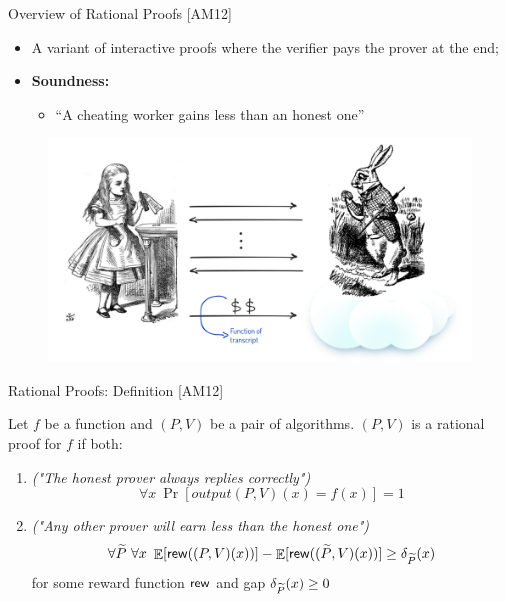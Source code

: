 \begin{frame}{Overview of Rational Proofs [AM12]}
\begin{itemize}[<+- | alert@+>]
	\item A variant of interactive proofs where the verifier pays the prover at the end;
	\item \textbf{Soundness:}
	\begin{itemize}
		\item ``A cheating worker gains less than an honest one''
	\end{itemize}
\end{itemize}
\begin{figure}
	\includegraphics[scale=0.23]{pics/interaction.png}
\end{figure}
\end{frame}


\begin{frame}{Rational Proofs: Definition [AM12]}
		\begin{framed}
			Let $f$ be a function and $(P,V)$ be a pair of algorithms. $(P,V)$ is a rational proof for $f$ if both:
			\onslide<+->
			\begin{enumerate}[<+- | alert@+>]
				\item \emph{("The honest prover always replies correctly")} 
				$$ \forall x\  \Pr[output(P,V)(x) = f(x) ] = 1$$
				\item \emph{("Any other prover will earn less than the honest one")}
				$$ \forall \widetilde{P} \ \forall x \  \mathop{\mathbb{E}}[\mathsf{rew}((P,V)(x))] - \mathop{\mathbb{E}}[\mathsf{rew}((\widetilde{P},V)(x))] \geq \delta_{\widetilde{P}}(x)  $$
				for some reward function $\mathsf{rew}$ and gap $\delta_{\widetilde{P}}(x) \geq 0$
			\end{enumerate}
		\end{framed}
		
\end{frame}